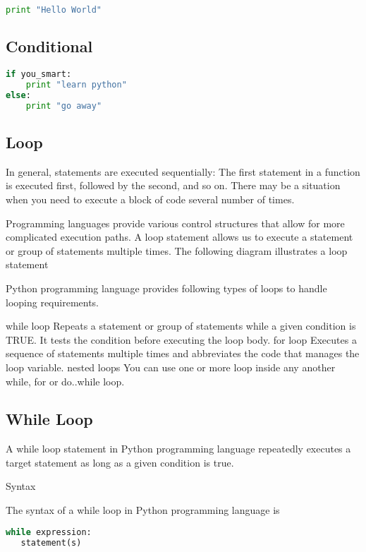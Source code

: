 \begin{lstlisting}[language=python]
print "Hello World"
\end{lstlisting}

\subsection{Conditional}

\begin{lstlisting}[language=Python]
if you_smart:
    print "learn python"
else:
    print "go away"
\end{lstlisting}

\subsection{Loop}

In general, statements are executed sequentially: The first statement in a function is executed first, followed by the second, and so on. There may be a situation when you need to execute a block of code several number of times.

Programming languages provide various control structures that allow for more complicated execution paths. A loop statement allows us to execute a statement or group of statements multiple times. The following diagram illustrates a loop statement


Python programming language provides following types of loops to handle looping requirements.

while loop	Repeats a statement or group of statements while a given condition is TRUE. It tests the condition before executing the loop body.
for loop	Executes a sequence of statements multiple times and abbreviates the code that manages the loop variable.
nested loops	You can use one or more loop inside any another while, for or do..while loop.

\subsection{While Loop}

A while loop statement in Python programming language repeatedly executes a target statement as long as a given condition is true.

Syntax

The syntax of a while loop in Python programming language is

\begin{lstlisting}[language=Python]
while expression:
   statement(s)
\end{lstlisting}

